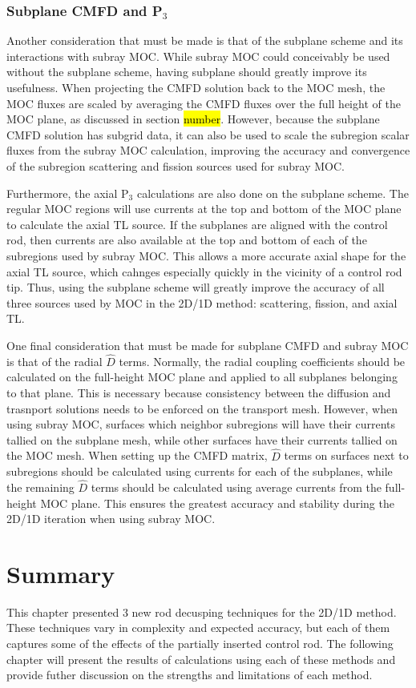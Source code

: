\subsubsection{Subplane CMFD and \texorpdfstring{P$_3$}{P3}}

Another consideration that must be made is that of the subplane scheme and its interactions with subray MOC.  While subray MOC could conceivably be used without the subplane scheme, having subplane should greatly improve its usefulness.  When projecting the CMFD solution back to the MOC mesh, the MOC fluxes are scaled by averaging the CMFD fluxes over the full height of the MOC plane, as discussed in section \hl{number}.  However, because the subplane CMFD solution has subgrid data, it can also be used to scale the subregion scalar fluxes from the subray MOC calculation, improving the accuracy and convergence of the subregion scattering and fission sources used for subray MOC.

Furthermore, the axial P$_3$ calculations are also done on the subplane scheme.  The regular MOC regions will use currents at the top and bottom of the MOC plane to calculate the axial TL source.  If the subplanes are aligned with the control rod, then currents are also available at the top and bottom of each of the subregions used by subray MOC.  This allows a more accurate axial shape for the axial TL source, which cahnges especially quickly in the vicinity of a control rod tip.  Thus, using the subplane scheme will greatly improve the accuracy of all three sources used by MOC in the 2D/1D method: scattering, fission, and axial TL.

One final consideration that must be made for subplane CMFD and subray MOC is that of the radial $\hat{D}$ terms.  Normally, the radial coupling coefficients should be calculated on the full-height MOC plane and applied to all subplanes belonging to that plane.  This is necessary because consistency between the diffusion and trasnport solutions needs to be enforced on the transport mesh.  However, when using subray MOC, surfaces which neighbor subregions will have their currents tallied on the subplane mesh, while other surfaces have their currents tallied on the MOC mesh.  When setting up the CMFD matrix, $\hat{D}$ terms on surfaces next to subregions should be calculated using currents for each of the subplanes, while the remaining $\hat{D}$ terms should be calculated using average currents from the full-height MOC plane.  This ensures the greatest accuracy and stability during the 2D/1D iteration when using subray MOC.

\section{Summary}

This chapter presented 3 new rod decusping techniques for the 2D/1D method.  These techniques vary in complexity and expected accuracy, but each of them captures some of the effects of the partially inserted control rod.  The following chapter will present the results of calculations using each of these methods and provide futher discussion on the strengths and limitations of each method.
